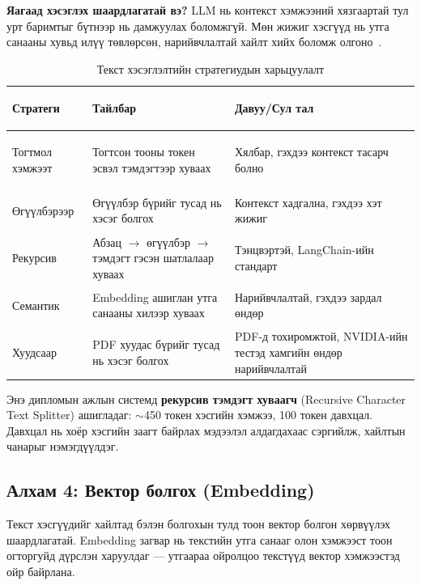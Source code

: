 \documentclass[12pt,A4]{report}
\begin{document}
\textbf{Яагаад хэсэглэх шаардлагатай вэ?} LLM нь контекст хэмжээний хязгаартай тул урт баримтыг бүтнээр нь дамжуулах боломжгүй. Мөн жижиг хэсгүүд нь утга санааны хувьд илүү төвлөрсөн, нарийвчлалтай хайлт хийх боломж олгоно~\cite{devto2026}.

\begin{table}[h!]
\centering
\small
\caption{Текст хэсэглэлтийн стратегиудын харьцуулалт}
\label{tab:chunking_strategies}
\begin{tabularx}{\textwidth}{>{\bfseries\raggedright\arraybackslash}p{2.8cm} >{\raggedright\arraybackslash}X >{\raggedright\arraybackslash}X}
\toprule
\textbf{Стратеги} & \textbf{Тайлбар} & \textbf{Давуу/Сул тал} \\
\midrule
\rowcolor{lightbg}
Тогтмол хэмжээт & Тогтсон тооны токен эсвэл тэмдэгтээр хуваах & Хялбар, гэхдээ контекст тасарч болно \\
Өгүүлбэрээр & Өгүүлбэр бүрийг тусад нь хэсэг болгох & Контекст хадгална, гэхдээ хэт жижиг \\
\rowcolor{lightbg}
Рекурсив & Абзац $\rightarrow$ өгүүлбэр $\rightarrow$ тэмдэгт гэсэн шатлалаар хуваах & Тэнцвэртэй, LangChain-ийн стандарт \\
Семантик & Embedding ашиглан утга санааны хилээр хуваах & Нарийвчлалтай, гэхдээ зардал өндөр \\
\rowcolor{lightbg}
Хуудсаар & PDF хуудас бүрийг тусад нь хэсэг болгох & PDF-д тохиромжтой, NVIDIA-ийн тестэд хамгийн өндөр нарийвчлалтай~\cite{firecrawl2025} \\
\bottomrule
\end{tabularx}
\end{table}

Энэ дипломын ажлын системд \textbf{рекурсив тэмдэгт хуваагч} (Recursive Character Text Splitter) ашигладаг: $\sim$450 токен хэсгийн хэмжээ, 100 токен давхцал. Давхцал нь хоёр хэсгийн заагт байрлах мэдээлэл алдагдахаас сэргийлж, хайлтын чанарыг нэмэгдүүлдэг.

\subsection{Алхам 4: Вектор болгох (Embedding)}

Текст хэсгүүдийг хайлтад бэлэн болгохын тулд тоон вектор болгон хөрвүүлэх шаардлагатай. Embedding загвар нь текстийн утга санааг олон хэмжээст тоон огторгуйд дүрслэн харуулдаг --- утгаараа ойролцоо текстүүд вектор хэмжээстэд ойр байрлана.
\end{document}
